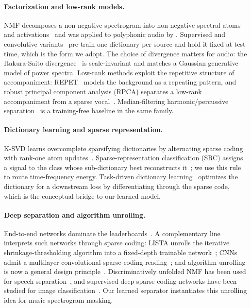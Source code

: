 \documentclass{article}
\begin{document}
\paragraph{Factorization and low-rank models.}
NMF decomposes a non-negative spectrogram into non-negative spectral atoms and
activations~\cite{lee1999nmf,lee2000algorithms} and was applied to polyphonic
audio by \citet{smaragdis2003nmf}. Supervised and convolutive
variants~\cite{smaragdis2007convolutive,virtanen2007monaural} pre-train one
dictionary per source and hold it fixed at test time, which is the form we adopt.
The choice of divergence matters for audio: the Itakura-Saito
divergence~\cite{fevotte2009isnmf} is scale-invariant and matches a Gaussian
generative model of power spectra. Low-rank methods exploit the repetitive
structure of accompaniment: REPET~\cite{rafii2013repet} models the background as a
repeating pattern, and robust principal component analysis (RPCA) separates a
low-rank accompaniment from a sparse vocal~\cite{candes2011rpca,huang2012rpca}.
Median-filtering harmonic/percussive separation~\cite{fitzgerald2010hpss} is a
training-free baseline in the same family.

\paragraph{Dictionary learning and sparse representation.}
K-SVD learns overcomplete sparsifying dictionaries by alternating sparse coding
with rank-one atom updates~\cite{aharon2006ksvd,engan1999mod}. Sparse-representation
classification (SRC) assigns a signal to the class whose sub-dictionary best
reconstructs it~\cite{wright2009src}; we use this rule to route time-frequency
energy. Task-driven dictionary learning~\cite{mairal2012taskdriven} optimizes the
dictionary for a downstream loss by differentiating through the sparse code, which
is the conceptual bridge to our learned model.

\paragraph{Deep separation and algorithm unrolling.}
End-to-end networks dominate the leaderboards~\cite{hennequin2020spleeter,%
stoter2019openunmix,defossez2021demucs,rouard2023htdemucs,luo2019convtasnet,%
mitsufuji2022mdx}. A complementary line interprets such networks through sparse
coding: LISTA unrolls the iterative shrinkage-thresholding algorithm into a
fixed-depth trainable network~\cite{gregor2010lista}; CNNs admit a multilayer
convolutional-sparse-coding reading~\cite{papyan2017cnncsc}; and algorithm
unrolling is now a general design
principle~\cite{monga2021unrolling,sprechmann2015efficient}. Discriminatively
unfolded NMF has been used for speech separation~\cite{leroux2015deepnmf}, and
supervised deep sparse coding networks have been studied for image
classification~\cite{sun2019scn}. Our learned separator instantiates this
unrolling idea for music spectrogram masking.
\end{document}
